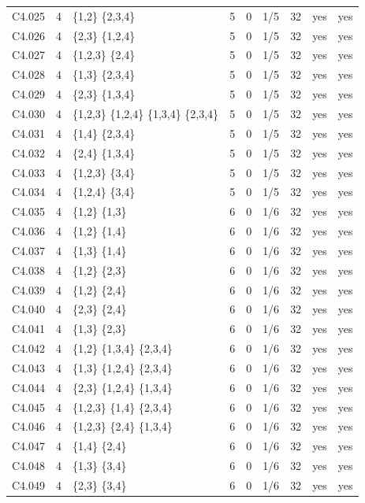 {\begin{longtable}{@{}llp{6.2cm}rllrll@{}}
C4.025 & 4 & \{1,2\} \{2,3,4\} & 5 & 0 & 1/5 & 32 & yes & yes \\
C4.026 & 4 & \{2,3\} \{1,2,4\} & 5 & 0 & 1/5 & 32 & yes & yes \\
C4.027 & 4 & \{1,2,3\} \{2,4\} & 5 & 0 & 1/5 & 32 & yes & yes \\
C4.028 & 4 & \{1,3\} \{2,3,4\} & 5 & 0 & 1/5 & 32 & yes & yes \\
C4.029 & 4 & \{2,3\} \{1,3,4\} & 5 & 0 & 1/5 & 32 & yes & yes \\
C4.030 & 4 & \{1,2,3\} \{1,2,4\} \{1,3,4\} \{2,3,4\} & 5 & 0 & 1/5 & 32 & yes & yes \\
C4.031 & 4 & \{1,4\} \{2,3,4\} & 5 & 0 & 1/5 & 32 & yes & yes \\
C4.032 & 4 & \{2,4\} \{1,3,4\} & 5 & 0 & 1/5 & 32 & yes & yes \\
C4.033 & 4 & \{1,2,3\} \{3,4\} & 5 & 0 & 1/5 & 32 & yes & yes \\
C4.034 & 4 & \{1,2,4\} \{3,4\} & 5 & 0 & 1/5 & 32 & yes & yes \\
C4.035 & 4 & \{1,2\} \{1,3\} & 6 & 0 & 1/6 & 32 & yes & yes \\
C4.036 & 4 & \{1,2\} \{1,4\} & 6 & 0 & 1/6 & 32 & yes & yes \\
C4.037 & 4 & \{1,3\} \{1,4\} & 6 & 0 & 1/6 & 32 & yes & yes \\
C4.038 & 4 & \{1,2\} \{2,3\} & 6 & 0 & 1/6 & 32 & yes & yes \\
C4.039 & 4 & \{1,2\} \{2,4\} & 6 & 0 & 1/6 & 32 & yes & yes \\
C4.040 & 4 & \{2,3\} \{2,4\} & 6 & 0 & 1/6 & 32 & yes & yes \\
C4.041 & 4 & \{1,3\} \{2,3\} & 6 & 0 & 1/6 & 32 & yes & yes \\
C4.042 & 4 & \{1,2\} \{1,3,4\} \{2,3,4\} & 6 & 0 & 1/6 & 32 & yes & yes \\
C4.043 & 4 & \{1,3\} \{1,2,4\} \{2,3,4\} & 6 & 0 & 1/6 & 32 & yes & yes \\
C4.044 & 4 & \{2,3\} \{1,2,4\} \{1,3,4\} & 6 & 0 & 1/6 & 32 & yes & yes \\
C4.045 & 4 & \{1,2,3\} \{1,4\} \{2,3,4\} & 6 & 0 & 1/6 & 32 & yes & yes \\
C4.046 & 4 & \{1,2,3\} \{2,4\} \{1,3,4\} & 6 & 0 & 1/6 & 32 & yes & yes \\
C4.047 & 4 & \{1,4\} \{2,4\} & 6 & 0 & 1/6 & 32 & yes & yes \\
C4.048 & 4 & \{1,3\} \{3,4\} & 6 & 0 & 1/6 & 32 & yes & yes \\
C4.049 & 4 & \{2,3\} \{3,4\} & 6 & 0 & 1/6 & 32 & yes & yes \\

\end{longtable}}
